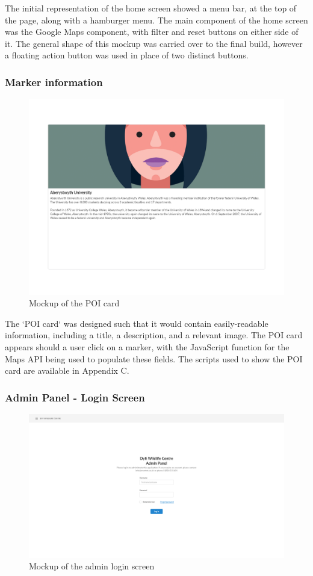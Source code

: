 The initial representation of the home screen showed a menu bar, at the top of the page, along with a hamburger menu. The main component of the home screen was the Google Maps component, with filter and reset buttons on either side of it. The general shape of this mockup was carried over to the final build, however a floating action button was used in place of two distinct buttons.
\newpage
\subsubsection{Marker information}
\begin{figure}[!htbp]
\includegraphics[scale=0.2]{mockups/POI card}
\caption{Mockup of the POI card}
\end{figure}

The `POI card` was designed such that it would contain easily-readable information, including a title, a description, and a relevant image. The POI card appears should a user click on a marker, with the JavaScript function for the Maps API being used to populate these fields. The scripts used to show the POI card are available in Appendix C.

\subsubsection{Admin Panel - Login Screen}
\begin{figure}[!htbp]
\includegraphics[scale=0.2]{mockups/Admin login screen}
\caption{Mockup of the admin login screen}
\end{figure}

